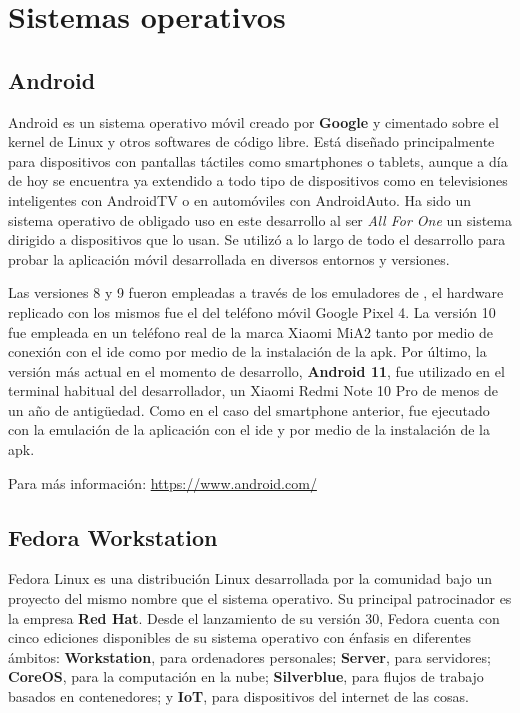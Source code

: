 \section{Sistemas operativos}

\subsection{Android}

Android es un sistema operativo móvil creado por \textbf{Google} y cimentado sobre el kernel de Linux y otros softwares de código libre. Está diseñado principalmente para dispositivos con pantallas táctiles como smartphones o tablets, aunque a día de hoy se encuentra ya extendido a todo tipo de dispositivos como en televisiones inteligentes con AndroidTV o en automóviles con AndroidAuto. Ha sido un sistema operativo de obligado uso en este desarrollo al ser \emph{All For One} un sistema dirigido a dispositivos que lo usan. Se utilizó a lo largo de todo el desarrollo para probar la aplicación móvil desarrollada en diversos entornos y versiones. 

Las versiones 8 y 9 fueron empleadas a través de los emuladores de , el hardware replicado con los mismos fue el del teléfono móvil Google Pixel 4. La versión 10 fue empleada en un teléfono real de la marca Xiaomi MiA2 tanto por medio de conexión con el \acrshort{ide} como por medio de la instalación de la \acrshort{apk}. Por último, la versión más actual en el momento de desarrollo, \textbf{Android 11}, fue utilizado en el terminal habitual del desarrollador, un Xiaomi Redmi Note 10 Pro de menos de un año de antigüedad. Como en el caso del smartphone anterior, fue ejecutado con la emulación de la aplicación con el \acrshort{ide} y por medio de la instalación de la \acrshort{apk}.

Para más información: \href{https://www.android.com/}{https://www.android.com/}

\subsection{Fedora Workstation}
\label{so:fedora_workstation}

Fedora Linux es una distribución Linux desarrollada por la comunidad bajo un proyecto del mismo nombre que el sistema operativo. Su principal patrocinador es la empresa \textbf{Red Hat}. Desde el lanzamiento de su versión 30, Fedora cuenta con cinco ediciones disponibles de su sistema operativo con énfasis en diferentes ámbitos: \textbf{Workstation}, para ordenadores personales; \textbf{Server}, para servidores; \textbf{CoreOS}, para la computación en la nube; \textbf{Silverblue}, para flujos de trabajo basados en contenedores; y \textbf{IoT}, para dispositivos del internet de las cosas.

